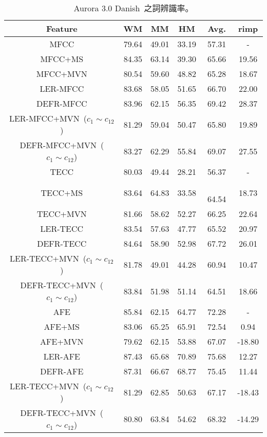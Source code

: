 \begin{table}[!htb]
\renewcommand{\arraystretch}{1.1}
\centering
\caption{Aurora 3.0 Danish~之詞辨識率。}
\label{table:aurora3_danish}  
\vspace{2mm}
\begin{tabular}{c|ccc|c|c}
\hline 
Feature & WM & MM & HM & Avg. & rimp  \\ 
\hline \hline
{MFCC} & 79.64 & 49.01 & 33.19 & 57.31 & -\\
{MFCC+MS} & 84.35 & 63.14 & 39.30 & 65.66 & 19.56\\
{MFCC+MVN} & 80.54 & 59.60 & 48.82 &65.28 & 18.67\\
{LER-MFCC} & 83.68 & 58.05 & 51.65 & 66.70 & 22.00\\
{DEFR-MFCC} & 83.96 & 62.15 & 56.35 & 69.42 & 28.37\\
{LER-MFCC+MVN~($c_1 \sim c_{12}$)} & 81.29 & 59.04 & 50.47 & 65.80 & 19.89\\
{DEFR-MFCC+MVN~($c_1 \sim c_{12}$)}  & 83.27 & 62.29 & 55.84 & 69.07 & 27.55\\
\hline
{TECC} & 80.03  & 49.44  & 28.21 & 56.37 & -\\
{TECC+MS} & 83.64  & 64.83  & 33.58 &　64.54 & 18.73 \\
{TECC+MVN} & 81.66  & 58.62  & 52.27  & 66.25 & 22.64\\
{LER-TECC} & 83.54  & 57.63  & 47.77  & 65.52 & 20.97\\
{DEFR-TECC} & 84.64  & 58.90  & 52.98  & 67.72 & 26.01\\
{LER-TECC+MVN~($c_1 \sim c_{12}$)} & 81.78  & 49.01  & 44.28  & 60.94 & 10.47\\
{DEFR-TECC+MVN~($c_1 \sim c_{12}$)}  & 83.84  & 51.98  & 51.14  & 64.51 & 18.66 \\
\hline
{AFE} & 85.84  & 62.15  & 64.77 & 72.28 & -\\
{AFE+MS} & 83.06  & 65.25  & 65.91 & 72.54 & 0.94\\ 
{AFE+MVN} & 79.62  & 62.15  & 53.88  & 67.07 & -18.80\\
{LER-AFE} & 87.43  & 65.68  & 70.89  & 75.68 & 12.27\\
{DEFR-AFE} & 87.31  & 66.67  & 68.77  & 75.45 & 11.44\\
{LER-TECC+MVN~($c_1 \sim c_{12}$)} & 81.29  & 62.85  & 50.63  & 67.17 & -18.43 \\
{DEFR-TECC+MVN~($c_1 \sim c_{12}$)} & 80.80  & 63.84  & 54.62  & 68.32 & -14.29\\
\hline
\end{tabular}
\end{table}

